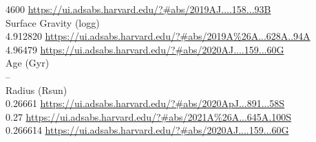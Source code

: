 4600 \url{https://ui.adsabs.harvard.edu/?#abs/2019AJ....158...93B}\\
Surface Gravity (logg) \\
4.912820 \url{https://ui.adsabs.harvard.edu/?#abs/2019A%26A...628A..94A}\\
4.96479 \url{https://ui.adsabs.harvard.edu/?#abs/2020AJ....159...60G}\\
Age (Gyr)\\
--\\
Radius (Rsun)\\
0.26661 \url{https://ui.adsabs.harvard.edu/?#abs/2020ApJ...891...58S}\\
0.27 \url{https://ui.adsabs.harvard.edu/?#abs/2021A%26A...645A.100S}\\
0.266614 \url{https://ui.adsabs.harvard.edu/?#abs/2020AJ....159...60G}\\